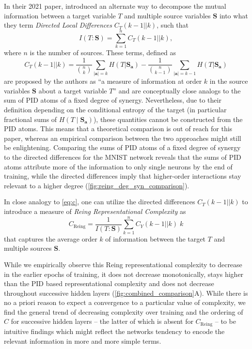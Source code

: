 \documentclass[10pt]{article}
\renewcommand\autoref[1]{\cref{#1}}
\theoremstyle{definition}
\theoremstyle{plain}
\begin{document}
In their 2021 paper, \citeauthor{reing_discovering_2021} introduced an alternate way to decompose the mutual information between a target variable $T$ and multiple source variables $\bm{S}$ into what they term \emph{Directed Local Differences} $C_T(k-1||k)$, such that
\begin{equation}
    I(T:\bm{S}) = \sum_{k=1}^n C_T(k-1||k),
\end{equation}
where $n$ is the number of sources. These terms, defined as
\begin{equation}
    C_T(k-1||k) = \frac{1}{\binom{n}{k}} \sum_{|\bm{a}|=k} H(T|\bm{S}_{\bm{a}}) - \frac{1}{\binom{n}{k-1}} \sum_{|\bm{a}|=k-1} H(T|\bm{S}_{\bm{a}})
\end{equation}
are proposed by the authors as ``a measure of information at order $k$ in the source variables $\bm{S}$ about a target variable $T$'' \citep{reing_discovering_2021} and are conceptually close analogs to the sum of PID atoms of a fixed degree of synergy. Nevertheless, due to their definition depending on the conditional entropy of the target (in particular fractional sums of $H(T\mid \bm{S}_{\bm a})$), these quantities cannot be constructed from the PID atoms. This means that a theoretical comparison is out of reach for this paper, whereas an empirical comparison between the two approaches might still be enlightening. Comparing the sums of PID atoms of a fixed degree of synergy to the directed differences for the MNIST network reveals that the sums of PID atoms attribute more of the information to only single neurons by the end of training, while the directed differences imply that higher-order interactions stay relevant to a higher degree (\autoref{fig:reing_deg_syn_comparison}).

In close analogy to \autoref{eq:c}, one can utilize the directed differences $C_T(k-1||k)$ to introduce a measure of \emph{Reing Representational Complexity} as
\begin{equation}
    C_{\text{Reing}} = \frac{1}{I(T:\bm{S})} \sum_{k=1}^n C_Y(k-1||k) \; k
    \label{eq:reing_repr_compl}
\end{equation}
that captures the average order $k$ of information between the target $T$ and multiple sources $\bm{S}$.

While we empirically observe this Reing representational complexity to decrease in the earlier epochs of training, it does not decrease monotonically, stays higher than the PID based representational complexity and does not decrease throughout successive hidden layers (\autoref{fig:combined_comparison}A). While there is no a priori reason to expect a convergence to a particular value of complexity, we find the general trend of decreasing complexity over training and the ordering of $C$ for successive hidden layers -- the latter of which is absent for $C_\mathrm{Reing}$ -- to be intuitive findings which might reflect the networks tendency to encode the relevant information in more and more simple terms.
\end{document}
